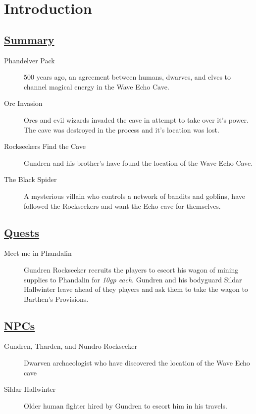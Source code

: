 	\section{Introduction}
\subsection*{\underline{Summary}}
\begin{description}
	\item[Phandelver Pack] 500 years ago, an agreement between humans, dwarves, and elves to channel magical energy in the Wave Echo Cave.
	\item[Orc Invasion] Orcs and evil wizards invaded the cave in attempt to take over it's power. The cave was destroyed in the process and it's location was lost.
	\item[Rockseekers Find the Cave] Gundren and his brother's have found the location of the Wave Echo Cave.
	\item[The Black Spider] A mysterious villain who controls a network of bandits and goblins, have followed the Rockseekers and want the Echo cave for themselves.
\end{description}

\subsection*{\underline{Quests}}
\begin{description}
	\item[Meet me in Phandalin] Gundren Rockseeker recruits the players to escort his wagon of mining supplies to Phandalin for \emph{10gp each}. Gundren and his bodyguard Sildar Hallwinter leave ahead of they players and ask them to take the wagon to Barthen's Provisions.
\end{description}

\subsection*{\underline{NPCs}}
\begin{description}
	\item[Gundren, Tharden, and Nundro Rockseeker] Dwarven archaeologist who have discovered the location of the Wave Echo cave
	\item[Sildar Hallwinter] Older human fighter hired by Gundren to escort him in his travels.
\end{description}